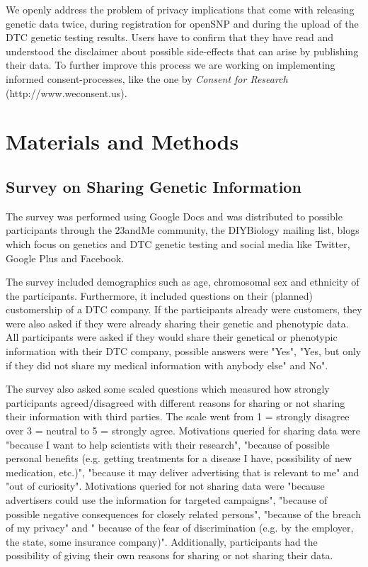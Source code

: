 \documentclass[10pt]{article}
\begin{document}
We openly address the problem of privacy implications that come with releasing genetic data twice, during registration for openSNP and during 
the upload of the DTC genetic testing results. Users have to confirm that they have read and understood the disclaimer about possible side-effects 
that can arise by publishing their data. To further improve this process we are working on implementing informed consent-processes,
like the one by \textit{Consent for Research} (http://www.weconsent.us).
 
\section*{Materials and Methods}
\subsection*{Survey on Sharing Genetic Information}
The survey was performed using Google Docs and was distributed to possible participants through the 23andMe community, the DIYBiology mailing list, 
blogs which focus on genetics and DTC genetic testing and social media like Twitter, Google Plus and Facebook.  

The survey included demographics such as age, chromosomal sex and ethnicity of the participants. Furthermore, it included questions on their 
(planned) customership of a DTC company. If the participants already were customers, they were also asked if they were already sharing their genetic and phenotypic data. 
All participants were asked if they would share their genetical or phenotypic information with their DTC company, possible answers were "Yes", "Yes, 
but only if they did not share my medical information with anybody else" and No".

The survey also asked some scaled questions which measured how strongly participants agreed/disagreed with different reasons for sharing or not sharing their 
information with third parties. The scale went from 1 = strongly disagree over 3 = neutral to  5 = strongly agree. Motivations queried for sharing data 
were "because I want to help scientists with their research", "because of possible personal benefits (e.g. getting treatments for a disease I have, 
possibility of new medication, etc.)", "because it may deliver advertising that is relevant to me" and "out of curiosity". Motivations queried for not sharing 
data were "because advertisers could use the information for targeted campaigns", "because of possible negative consequences for closely related persons", 
"because of the breach of my privacy" and " because of the fear of discrimination (e.g. by the employer, the state, some insurance company)". 
Additionally, participants had the possibility of giving their own reasons for sharing or not sharing their data.
\end{document}
